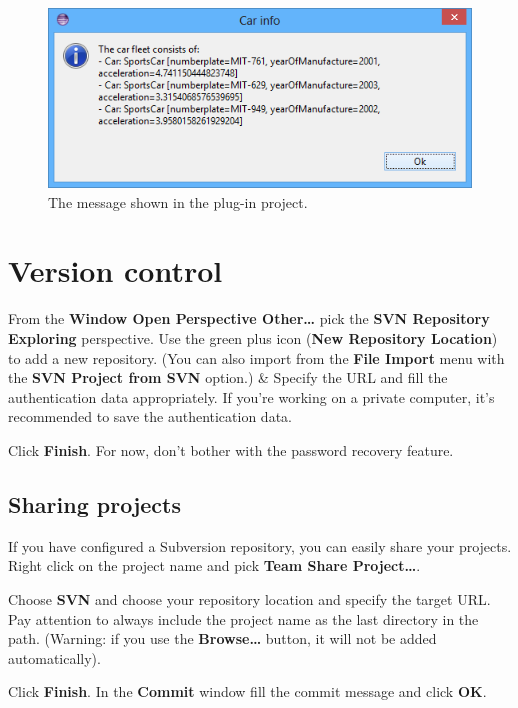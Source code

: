 \documentclass[]{report}
\let\Oldincludegraphics\includegraphics
\renewcommand{\includegraphics}[1]{
\begin{adjustbox}{max size={\textwidth}{\textheight}}
    \Oldincludegraphics[scale=0.6]{#1}%
\end{adjustbox}
}
\begin{document}
\begin{figure}[htbp]
\centering
\includegraphics{img/eclipse_basics/message.png}
\caption{The message shown in the plug-in project.}
\end{figure}

\section{Version control}

From the \textbf{Window \textbar{} Open Perspective \textbar{}
Other\ldots{}} pick the \textbf{SVN Repository Exploring} perspective.
Use the green plus icon (\textbf{New Repository Location}) to add a new
repository. (You can also import from the \textbf{File \textbar{}
Import} menu with the \textbf{SVN \textbar{} Project from SVN} option.)
\& Specify the URL and fill the authentication data appropriately. If
you're working on a private computer, it's recommended to save the
authentication data.

Click \textbf{Finish}. For now, don't bother with the password recovery
feature.

\subsection{Sharing projects}

If you have configured a Subversion repository, you can easily share
your projects. Right click on the project name and pick \textbf{Team
\textbar{} Share Project\ldots{}}.

Choose \textbf{SVN} and choose your repository location and specify the
target URL. Pay attention to always include the project name as the last
directory in the path. (Warning: if you use the \textbf{Browse\ldots{}}
button, it will not be added automatically).

Click \textbf{Finish}. In the \textbf{Commit} window fill the commit
message and click \textbf{OK}.
\end{document}
